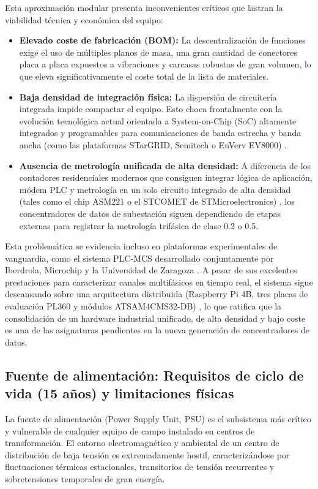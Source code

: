 Esta aproximación modular presenta inconvenientes críticos que lastran la viabilidad técnica y económica del equipo:
\begin{itemize}
    \item \textbf{Elevado coste de fabricación (BOM):} La descentralización de funciones exige el uso de múltiples planos de masa, una gran cantidad de conectores placa a placa expuestos a vibraciones y carcasas robustas de gran volumen, lo que eleva significativamente el coste total de la lista de materiales.
    \item \textbf{Baja densidad de integración física:} La dispersión de circuitería integrada impide compactar el equipo. Esto choca frontalmente con la evolución tecnológica actual orientada a System-on-Chip (SoC) altamente integrados y programables para comunicaciones de banda estrecha y banda ancha (como las plataformas STarGRID, Semitech o EnVerv EV8000) \cite{SHARMA2017704}.
    \item \textbf{Ausencia de metrología unificada de alta densidad:} A diferencia de los contadores residenciales modernos que consiguen integrar lógica de aplicación, módem PLC y metrología en un solo circuito integrado de alta densidad (tales como el chip ASM221 o el STCOMET de STMicroelectronics) \cite{SHARMA2017704}, los concentradores de datos de subestación siguen dependiendo de etapas externas para registrar la metrología trifásica de clase 0.2 o 0.5. 
\end{itemize}

Esta problemática se evidencia incluso en plataformas experimentales de vanguardia, como el sistema PLC-MCS desarrollado conjuntamente por Iberdrola, Microchip y la Universidad de Zaragoza \cite{10488780}. A pesar de sus excelentes prestaciones para caracterizar canales multifásicos en tiempo real, el sistema sigue descansando sobre una arquitectura distribuida (Raspberry Pi 4B, tres placas de evaluación PL360 y módulos ATSAM4CMS32-DB) \cite{10488780}, lo que ratifica que la consolidación de un hardware industrial unificado, de alta densidad y bajo coste es una de las asignaturas pendientes en la nueva generación de concentradores de datos.

\subsection{Fuente de alimentación: Requisitos de ciclo de vida (15 años) y limitaciones físicas}
\label{subsec:fuente_alimentacion_15anos}

La fuente de alimentación (Power Supply Unit, PSU) es el subsistema más crítico y vulnerable de cualquier equipo de campo instalado en centros de transformación. El entorno electromagnético y ambiental de un centro de distribución de baja tensión es extremadamente hostil, caracterizándose por fluctuaciones térmicas estacionales, transitorios de tensión recurrentes y sobretensiones temporales de gran energía. 

